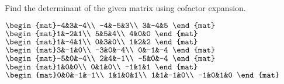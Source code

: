 
\begin{Exercise}[
name={},
title={}, 
difficulty=0,
origin={\cite{GH}}]
Find the determinant of the given matrix using cofactor expansion.
\begin{multicols}{2}
\Question $\begin{mat}-4&3&-4\\  -4&-5&3\\  3&-4&5 \end{mat}$
\Question $\begin{mat}1&-2&1\\  5&5&4\\  4&0&0 \end{mat}$
\Question $\begin{mat}1&-4&1\\  0&3&0\\  1&2&2 \end{mat}$
\Question $\begin{mat}3&-1&0\\  -3&0&-4\\  0&-1&-4 \end{mat}$
\Question $\begin{mat}-5&0&-4\\  2&4&-1\\  -5&0&-4 \end{mat}$
\Question $\begin{mat}1&0&0\\  0&1&0\\  -1&1&1 \end{mat}$
\Question $\begin{mat}0&0&-1&-1\\  1&1&0&1\\  1&1&-1&0\\  -1&0&1&0 \end{mat}$

\end{multicols}
\end{Exercise}
